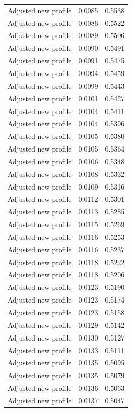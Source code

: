 \begin{table}[htbp]
\begin{tabular}{lll}
Adjusted new profile & 0.0085 & 0.5538 \\
Adjusted new profile & 0.0086 & 0.5522 \\
Adjusted new profile & 0.0089 & 0.5506 \\
Adjusted new profile & 0.0090 & 0.5491 \\
Adjusted new profile & 0.0091 & 0.5475 \\
Adjusted new profile & 0.0094 & 0.5459 \\
Adjusted new profile & 0.0099 & 0.5443 \\
Adjusted new profile & 0.0101 & 0.5427 \\
Adjusted new profile & 0.0104 & 0.5411 \\
Adjusted new profile & 0.0104 & 0.5396 \\
Adjusted new profile & 0.0105 & 0.5380 \\
Adjusted new profile & 0.0105 & 0.5364 \\
Adjusted new profile & 0.0106 & 0.5348 \\
Adjusted new profile & 0.0108 & 0.5332 \\
Adjusted new profile & 0.0109 & 0.5316 \\
Adjusted new profile & 0.0112 & 0.5301 \\
Adjusted new profile & 0.0113 & 0.5285 \\
Adjusted new profile & 0.0115 & 0.5269 \\
Adjusted new profile & 0.0116 & 0.5253 \\
Adjusted new profile & 0.0116 & 0.5237 \\
Adjusted new profile & 0.0118 & 0.5222 \\
Adjusted new profile & 0.0118 & 0.5206 \\
Adjusted new profile & 0.0123 & 0.5190 \\
Adjusted new profile & 0.0123 & 0.5174 \\
Adjusted new profile & 0.0123 & 0.5158 \\
Adjusted new profile & 0.0129 & 0.5142 \\
Adjusted new profile & 0.0130 & 0.5127 \\
Adjusted new profile & 0.0133 & 0.5111 \\
Adjusted new profile & 0.0135 & 0.5095 \\
Adjusted new profile & 0.0135 & 0.5079 \\
Adjusted new profile & 0.0136 & 0.5063 \\
Adjusted new profile & 0.0137 & 0.5047 \\

\end{tabular}
\end{table}
